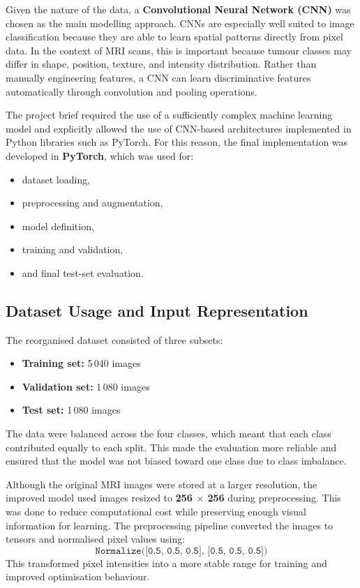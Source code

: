 \documentclass{article}
\begin{document}
Given the nature of the data, a \textbf{Convolutional Neural Network (CNN)} was chosen as the main modelling approach. CNNs are especially well suited to image classification because they are able to learn spatial patterns directly from pixel data. In the context of MRI scans, this is important because tumour classes may differ in shape, position, texture, and intensity distribution. Rather than manually engineering features, a CNN can learn discriminative features automatically through convolution and pooling operations.

The project brief required the use of a sufficiently complex machine learning model and explicitly allowed the use of CNN-based architectures implemented in Python libraries such as PyTorch. For this reason, the final implementation was developed in \textbf{PyTorch}, which was used for:
\begin{itemize}
    \item dataset loading,
    \item preprocessing and augmentation,
    \item model definition,
    \item training and validation,
    \item and final test-set evaluation.
\end{itemize}

\subsection{Dataset Usage and Input Representation}

The reorganised dataset consisted of three subsets:
\begin{itemize}
    \item \textbf{Training set:} 5\,040 images
    \item \textbf{Validation set:} 1\,080 images
    \item \textbf{Test set:} 1\,080 images
\end{itemize}

The data were balanced across the four classes, which meant that each class contributed equally to each split. This made the evaluation more reliable and ensured that the model was not biased toward one class due to class imbalance.

Although the original MRI images were stored at a larger resolution, the improved model used images resized to \textbf{256 $\times$ 256} during preprocessing. This was done to reduce computational cost while preserving enough visual information for learning. The preprocessing pipeline converted the images to tensors and normalised pixel values using:
\[
\texttt{Normalize([0.5, 0.5, 0.5], [0.5, 0.5, 0.5])}
\]
This transformed pixel intensities into a more stable range for training and improved optimisation behaviour.
\end{document}
